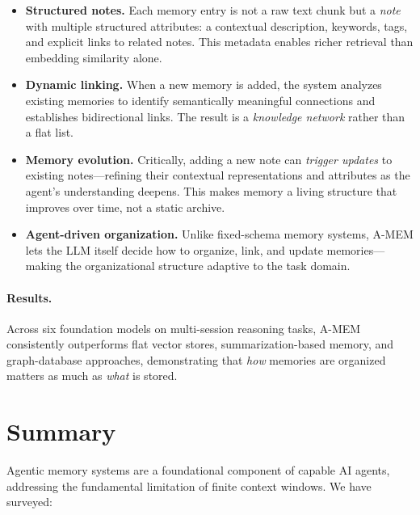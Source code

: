 \begin{itemize}
  \item \textbf{Structured notes.} Each memory entry is not a raw text chunk but a \emph{note} with multiple structured attributes: a contextual description, keywords, tags, and explicit links to related notes. This metadata enables richer retrieval than embedding similarity alone.
  \item \textbf{Dynamic linking.} When a new memory is added, the system analyzes existing memories to identify semantically meaningful connections and establishes bidirectional links. The result is a \emph{knowledge network} rather than a flat list.
  \item \textbf{Memory evolution.} Critically, adding a new note can \emph{trigger updates} to existing notes---refining their contextual representations and attributes as the agent’s understanding deepens. This makes memory a living structure that improves over time, not a static archive.
  \item \textbf{Agent-driven organization.} Unlike fixed-schema memory systems, A-MEM lets the LLM itself decide how to organize, link, and update memories---making the organizational structure adaptive to the task domain.
\end{itemize}

\paragraph{Results.}
\label{results.-1}

Across six foundation models on multi-session reasoning tasks, A-MEM consistently outperforms flat vector stores, summarization-based memory, and graph-database approaches, demonstrating that \emph{how} memories are organized matters as much as \emph{what} is stored.

\section{Summary}
\label{sec:memory-summary}

Agentic memory systems are a foundational component of capable AI agents, addressing the fundamental limitation of finite context windows. We have surveyed:

